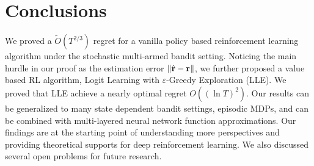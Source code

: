 \section{Conclusions}
\label{sec:conclusions}
We proved a $\tilde{O}(T^{2/3})$ regret for a vanilla policy based reinforcement learning algorithm under the stochastic multi-armed bandit setting. 
Noticing the main hurdle in our proof as the estimation error $\|\hat{{\mathbf{r}}} - {\mathbf{r}}\|$, we further proposed a value based RL algorithm, Logit Learning with $\varepsilon$-Greedy Exploration (LLE). 
We proved that LLE achieve a nearly optimal regret $O((\ln T)^2)$.
Our results can be generalized to many state dependent bandit settings, episodic MDPs, and can be combined with multi-layered neural network function approximations. Our findings are at the starting point of understanding more perspectives and providing theoretical supports for deep reinforcement learning. We also discussed several open problems for future research.
\newpage